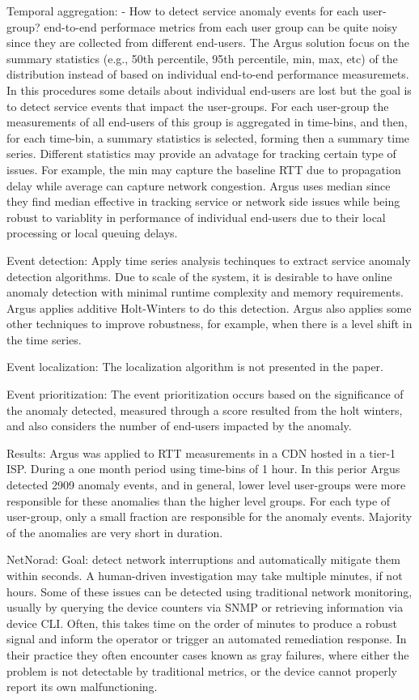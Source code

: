 Temporal aggregation:
- How to detect service anomaly events for each user-group? end-to-end
performace metrics from each user group can be quite noisy since they are
collected from different end-users. The Argus solution focus on the summary
statistics (e.g., 50th percentile, 95th percentile, min, max, etc) of the
distribution instead of based on individual end-to-end performance
measuremets. In this procedures some details about individual end-users are lost
but the goal is to detect service events that impact the user-groups.
For each user-group the measurements of all end-users of this group is
aggregated in time-bins, and then, for each time-bin, a summary statistics is
selected, forming then a summary time series. Different statistics may provide
an advatage for tracking certain type of issues. For example, the min may
capture the baseline RTT due to propagation delay while average can capture
network congestion. Argus uses median since they find median effective in
tracking service or network side issues while being robust to variablity in
performance of individual end-users due to their local processing or local
queuing delays.

Event detection:
Apply time series analysis techinques to extract service anomaly detection
algorithms. Due to scale of the system, it is desirable to have online
anomaly detection with minimal runtime complexity and memory requirements.
Argus applies additive Holt-Winters to do this detection. Argus also applies
some other techniques to improve robustness, for example, when there is a level
shift in the time series.

Event localization:
The localization algorithm is not presented in the paper.

Event prioritization:
The event prioritization occurs based on the significance of the anomaly
detected, measured through a score resulted from the holt winters, and also
considers the number of end-users impacted by the anomaly.

Results:
Argus was applied to RTT measurements in a CDN hosted in a tier-1 ISP. During a
one month period using time-bins of 1 hour. In this perior Argus detected 2909
anomaly events, and in general, lower level user-groups were more responsible
for these anomalies than the higher level groups. For each type of user-group,
only a small fraction are responsible for the anomaly events. Majority of the
anomalies are very short in duration.

NetNorad:
Goal: detect network interruptions and automatically mitigate them within
seconds. A human-driven investigation may take multiple minutes, if not hours.
Some of these issues can be detected using traditional network monitoring,
usually by querying the device counters via SNMP or retrieving information via
device CLI. Often, this takes time on the order of minutes to produce a robust
signal and inform the operator or trigger an automated remediation response. In
their practice they often encounter cases known as gray failures, where either
the problem is not detectable by traditional metrics, or the device cannot
properly report its own malfunctioning.


